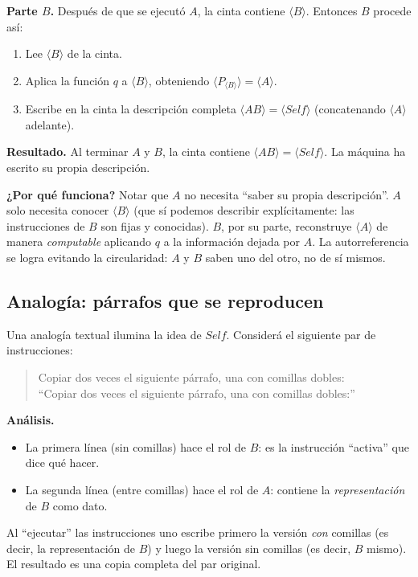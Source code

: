 \documentclass[11pt,a4paper]{article}
\theoremstyle{definicion}
\newcommand{\enc}[1]{\langle #1 \rangle}
\begin{document}
\textbf{Parte $B$.} Después de que se ejecutó $A$, la cinta contiene $\enc{B}$. Entonces $B$ procede así:
\begin{enumerate}
    \item Lee $\enc{B}$ de la cinta.
    \item Aplica la función $q$ a $\enc{B}$, obteniendo $\enc{P_{\enc{B}}} = \enc{A}$.
    \item Escribe en la cinta la descripción completa $\enc{AB} = \enc{\mathit{Self}}$ (concatenando $\enc{A}$ adelante).
\end{enumerate}

\textbf{Resultado.} Al terminar $A$ y $B$, la cinta contiene $\enc{AB} = \enc{\mathit{Self}}$. La máquina ha escrito su propia descripción.

\begin{intuicion}
\textbf{¿Por qué funciona?} Notar que $A$ no necesita ``saber su propia descripción''. $A$ solo necesita conocer $\enc{B}$ (que sí podemos describir explícitamente: las instrucciones de $B$ son fijas y conocidas). $B$, por su parte, reconstruye $\enc{A}$ de manera \emph{computable} aplicando $q$ a la información dejada por $A$. La autorreferencia se logra evitando la circularidad: $A$ y $B$ saben uno del otro, no de sí mismos.
\end{intuicion}

\subsection{Analogía: párrafos que se reproducen}

Una analogía textual ilumina la idea de $\mathit{Self}$. Considerá el siguiente par de instrucciones:

\begin{quote}
Copiar dos veces el siguiente párrafo, una con comillas dobles:\\
``Copiar dos veces el siguiente párrafo, una con comillas dobles:''
\end{quote}

\textbf{Análisis.}
\begin{itemize}
    \item La primera línea (sin comillas) hace el rol de $B$: es la instrucción ``activa'' que dice qué hacer.
    \item La segunda línea (entre comillas) hace el rol de $A$: contiene la \emph{representación} de $B$ como dato.
\end{itemize}

Al ``ejecutar'' las instrucciones uno escribe primero la versión \emph{con} comillas (es decir, la representación de $B$) y luego la versión sin comillas (es decir, $B$ mismo). El resultado es una copia completa del par original.
\end{document}
